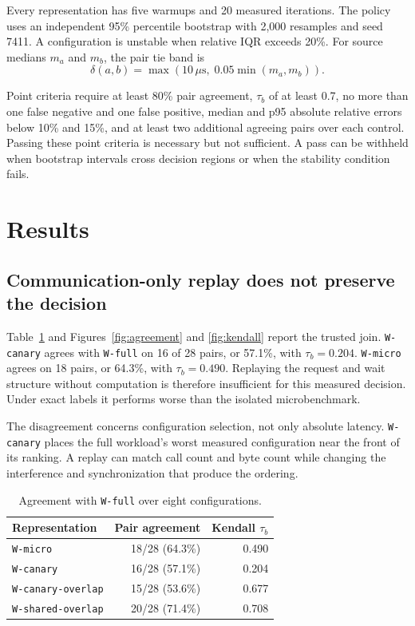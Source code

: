 \documentclass[10pt,twocolumn]{article}
\newcommand{\wname}[1]{\texttt{W-#1}}
\newcommand{\us}{\,\mu\mathrm{s}}
\begin{document}
Every representation has five warmups and 20 measured iterations. The policy
uses an independent 95\% percentile bootstrap with 2,000 resamples and seed
7411. A configuration is unstable when relative IQR exceeds 20\%. For source
medians $m_a$ and $m_b$, the pair tie band is
\begin{equation}
  \delta(a,b)=\max(10\us,\;0.05\min(m_a,m_b)).
\end{equation}

Point criteria require at least 80\% pair agreement, $\tau_b$ of at least 0.7,
no more than one false negative and one false positive, median and p95 absolute
relative errors below 10\% and 15\%, and at least two additional agreeing pairs
over each control. Passing these point criteria is necessary but not
sufficient. A pass can be withheld when bootstrap intervals cross decision
regions or when the stability condition fails.

\section{Results}

\subsection{Communication-only replay does not preserve the decision}

Table~\ref{tab:agreement} and Figures~\ref{fig:agreement} and
\ref{fig:kendall} report the trusted join. \wname{canary} agrees with
\wname{full} on 16 of 28 pairs, or 57.1\%, with $\tau_b=0.204$.
\wname{micro} agrees on 18 pairs, or 64.3\%, with $\tau_b=0.490$. Replaying
the request and wait structure without computation is therefore insufficient
for this measured decision. Under exact labels it performs worse than the
isolated microbenchmark.

The disagreement concerns configuration selection, not only absolute latency.
\wname{canary} places the full workload's worst measured configuration near the
front of its ranking. A replay can match call count and byte count while
changing the interference and synchronization that produce the ordering.

\begin{table}[t]
\caption{Agreement with \wname{full} over eight configurations.}
\label{tab:agreement}
\centering\small
\begin{tabular}{@{}lrr@{}}
\toprule
Representation & Pair agreement & Kendall $\tau_b$ \\
\midrule
\wname{micro} & 18/28 (64.3\%) & 0.490 \\
\wname{canary} & 16/28 (57.1\%) & 0.204 \\
\wname{canary-overlap} & 15/28 (53.6\%) & 0.677 \\
\wname{shared-overlap} & 20/28 (71.4\%) & 0.708 \\
\bottomrule
\end{tabular}
\end{table}
\end{document}
